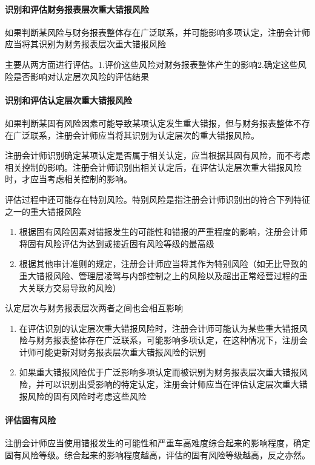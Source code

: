 \documentclass[UTF8,12pt]{ctexart}
\numberwithin{equation}{section} %
\numberwithin{figure}{section}
\numberwithin{table}{section}
\begin{document}
	\paragraph{识别和评估财务报表层次重大错报风险}
	如果判断某风险与财务报表整体存在广泛联系，并可能影响多项认定，注册会计师应当将其识别为财务报表层次重大错报风险
	
	主要从两方面进行评估。1.评价这些风险对财务报表整体产生的影响2.确定这些风险是否影响对认定层次风险的评估结果
	
	\paragraph{识别和评估认定层次重大错报风险}
	如果判断某固有风险因素可能导致某项认定发生重大错报，但与财务报表整体不存在广泛联系，注册会计师应当将其识别为认定层次的重大错报风险。
	
	注册会计师识别确定某项认定是否属于相关认定，应当根据其固有风险，而不考虑相关控制的影响。注册会计师识别出相关认定后，在评估认定层次重大错报风险时，才应当考虑相关控制的影响。
	
	评估过程中还可能存在特别风险。特别风险是指注册会计师识别出的符合下列特征之一的重大错报风险
	\begin{enumerate}
		\item 根据固有风险因素对错报发生的可能性和错报的严重程度的影响，注册会计师将固有风险评估为达到或接近固有风险等级的最高级
		
		\item 根据其他审计准则的规定，注册会计师应当将其作为特别风险（如无比导致的重大错报风险、管理层凌驾与内部控制之上的风险以及超出正常经营过程的重大关联方交易导致的风险）
	\end{enumerate}
	
	认定层次与财务报表层次两者之间也会相互影响
	\begin{enumerate}
		\item 在评估识别的认定层次重大错报风险时，注册会计师可能认为某些重大错报风险与财务报表整体存在广泛联系，可能影响多项认定，在这种情况下，注册会计师可能更新对财务报表层次重大错报风险的识别
		
		\item 如果重大错报风险优于广泛影响多项认定而被识别为财务报表层次重大错报风险，并可以识别出受影响的特定认定，注册会计师应当在评估认定层次重大错报风险的固有风险时考虑这些风险
	\end{enumerate}
	
	\paragraph{评估固有风险}
	注册会计师应当使用错报发生的可能性和严重车高难度综合起来的影响程度，确定固有风险等级。综合起来的影响程度越高，评估的固有风险等级越高，反之亦然。
	
\end{document}
